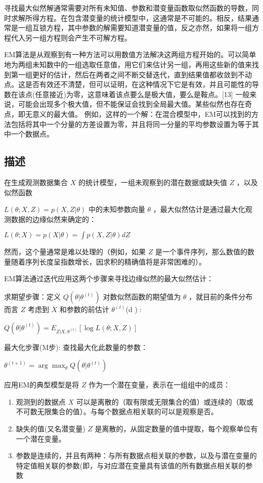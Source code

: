 寻找最大似然解通常需要对所有未知值、参数和潜变量函数取似然函数的导数，同时求解所得方程。在包含潜变量的统计模型中，这通常是不可能的。相反，结果通常是一组互锁方程，其中参数的解需要知道潜变量的值，反之亦然，如果将一组方程代入另一组方程则会产生不可解方程。

EM算法是从观察到有一种方法可以用数值方法解决这两组方程开始的。可以简单地为两组未知数中的一组选取任意值，用它们来估计另一组，再用这些新的值来找到第一组更好的估计，然后在两者之间不断交替迭代，直到结果值都收敛到不动点。这是否有效还不清楚，但可以证明，在这种情况下它是有效，并且可能性的导数在该点(任意接近)为零，这意味着该点要么是极大值，要么是鞍点。[13] 一般来说，可能会出现多个极大值，但不能保证会找到全局最大值。某些似然也存在奇点，即无意义的最大值。 例如，这样的一个解：在混合模型中，EM可以找到的方法包括将其中一个分量的方差设置为零，并且将同一分量的平均参数设置为等于其中一个数据点。

\subsection{描述}

在生成观测数据集合 $X$ 的统计模型，一组未观察到的潜在数据或缺失值 $Z$ ，以及似然函数 

$L(\theta; X, Z) = p(X, Z | \theta)$
中的未知参数向量 $\theta$ ，最大似然估计是通过最大化观测数据的边缘似然来确定的：

$L(\theta; X) = p(X | \theta) = \int p(X, Z | \theta) dZ$

然而，这个量通常是难以处理的（例如，如果 $Z$ 是一个事件序列，那么数值的数量随着序列长度呈指数增长，因求积的精确值将是非常困难的）。

EM算法通过迭代应用这两个步骤来寻找边缘似然的最大似然估计：

求期望步骤：定义 $Q(\theta | \theta^{(t)})$ 对数似然函数的期望值为 $\theta$ ，就目前的条件分布而言 $Z$ 考虑到 $X$ 和参数的前估计 $\theta^{(t)}$(d ) :

$Q(\theta | \theta^{(t)}) = E_{Z|X,\theta^{(t)}} [\log L(\theta; X, Z)]$

最大化步骤(M步): 查找最大化此数量的参数：

$\theta^{(t+1)} = \arg \max_{\theta} Q(\theta | \theta^{(t)})$

应用EM的典型模型是将 $Z$ 作为一个潜在变量，表示在一组组中的成员：

\begin{enumerate}
\item 观测到的数据点 $X$ 可以是离散的（取有限或无限集合的值）或连续的（取或不可数无限集合的值）。与每个数据点相关联的可以是观察是否。
\item 缺失的值(又名潜变量) $Z$ 是离散的，从固定数量的值中提取，每个观察单位有一个潜在变量。
\item 参数是连续的，并且有两种：与所有数据点相关联的参数，以及与潜在变量的特定值相关联的参数(即，与对应潜在变量具有该值的所有数据点相关联的参数
\end{enumerate}

